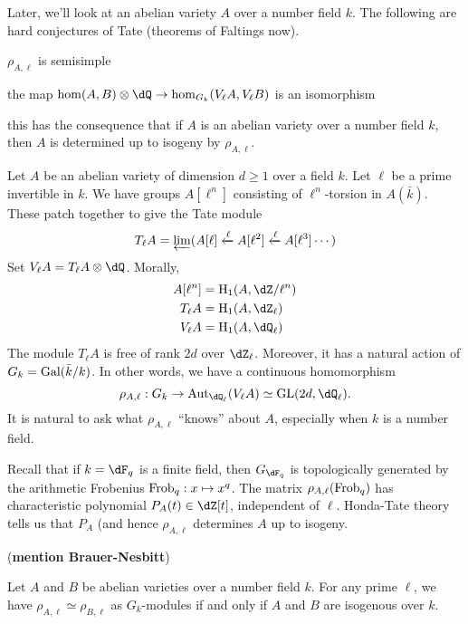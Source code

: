 Later, we'll look at an abelian variety $A$ over a number field $k$. The following 
are hard conjectures of Tate (theorems of Faltings now). 

$\rho_{A,\ell}$ is semisimple 

the map $\hom(A,B)\otimes\dQ \to \hom_{G_k}(V_\ell A,V_\ell B)$ is an isomorphism 

this has the consequence that if $A$ is an abelian variety over a number field 
$k$, then $A$ is determined up to isogeny by $\rho_{A,\ell}$. 






Let $A$ be an abelian variety of dimension $d\geqslant 1$ over a field $k$. Let 
$\ell$ be a prime invertible in $k$. We have groups 
$A[\ell^n]$ consisting of $\ell^n$-torsion in $A(\bar k)$. These patch together 
to give the Tate module 
\[
  T_\ell A = \varprojlim (A[\ell] \xleftarrow\ell A[\ell^2] \xleftarrow\ell A[\ell^3]\cdots) 
\]
Set $V_\ell A = T_\ell A\otimes\dQ$. Morally, 
\begin{align*}
  A[\ell^n] &= \h_1(A,\dZ/\ell^n) \\
  T_\ell A  &= \h_1(A,\dZ_\ell) \\
  V_\ell A &= \h_1(A,\dQ_\ell)
\end{align*}
The module $T_\ell A$ is free of rank $2 d$ over $\dZ_\ell$. Moreover, it has a 
natural action of $G_k=\operatorname{Gal}(\bar k/k)$. In other words, we have a continuous 
homomorphism 
\[
  \rho_{A,\ell} : G_k \to \aut_{\dQ_\ell}(V_\ell A) \simeq \operatorname{GL}(2 d,\dQ_\ell) \text{.}
\]
It is natural to ask what $\rho_{A,\ell}$ ``knows'' about $A$, especially when 
$k$ is a number field. 

Recall that if $k=\dF_q$ is a finite field, then $G_{\dF_q}$ is topologically 
generated by the arithmetic Frobenius $\mathrm{Frob}_q:x\mapsto x^q$. The matrix 
$\rho_{A,\ell}(\mathrm{Frob}_q)$ has characteristic polynomial $P_A(t)\in \dZ[t]$, 
independent of $\ell$. Honda-Tate theory tells us that $P_A$ (and hence 
$\rho_{A,\ell}$ determines $A$ up to isogeny. 

(\textbf{mention Brauer-Nesbitt})

\begin{theorem}
Let $A$ and $B$ be abelian varieties over a number field $k$. For any prime 
$\ell$, we have $\rho_{A,\ell}\simeq \rho_{B,\ell}$ as $G_k$-modules if and 
only if $A$ and $B$ are isogenous over $k$. 
\end{theorem}


